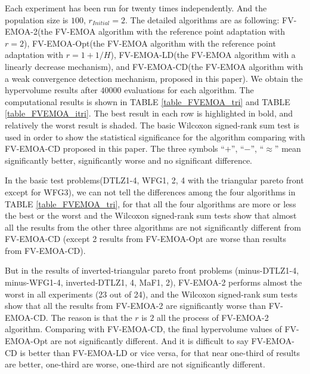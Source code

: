 \documentclass[conference]{IEEEtran}
\begin{document}
Each experiment has been run for twenty times independently. 
And the population size is $100$, $r_{Initial}=2$.
The detailed algorithms are as following: 
FV-EMOA-2(the FV-EMOA\cite{FVEMOA} algorithm with the reference point adaptation with $r=2$),
FV-EMOA-Opt(the FV-EMOA algorithm with the reference point adaptation with $r=1+1/H$),
FV-EMOA-LD(the FV-EMOA algorithm with a linearly decrease mechanism),
and FV-EMOA-CD(the FV-EMOA algorithm with a weak convergence detection mechanism, proposed in this paper).
We obtain the hypervolume results after $40000$ evaluations for each algorithm. 
The computational results is shown in TABLE \ref{table_FVEMOA_tri} and TABLE \ref{table_FVEMOA_itri}. 
The best result in each row is highlighted in bold, and relatively the worst result is shaded. 
The basic Wilcoxon signed-rank sum test is used in order to show the statistical significance for the algorithm
comparing with FV-EMOA-CD proposed in this paper. The three symbols ``$+$'', ``$-$'', ``$\approx$'' 
mean significantly better, significantly worse and no significant difference.

In the basic test problems(DTLZ1-4, WFG1, 2, 4 with the triangular pareto front except for WFG3), 
we can not tell the differences among the four algorithms in TABLE \ref{table_FVEMOA_tri},
for that all the four algorithms are more or less the best or the worst 
and the Wilcoxon signed-rank sum tests show that almost all the results from the other three algorithms are not significantly different from FV-EMOA-CD
(except 2 results from FV-EMOA-Opt are worse than results from FV-EMOA-CD). 

But in the results of inverted-triangular pareto front problems (minus-DTLZ1-4, minus-WFG1-4, inverted-DTLZ1, 4, MaF1, 2), 
FV-EMOA-2 performs almost the worst in all experiments (23 out of 24), 
and the Wilcoxon signed-rank sum tests show that all the results from FV-EMOA-2 are significantly worse than FV-EMOA-CD. 
The reason is that the $r$ is $2$ all the process of FV-EMOA-2 algorithm. 
Comparing with FV-EMOA-CD, the final hypervolume values of FV-EMOA-Opt are not significantly different. 
And it is difficult to say FV-EMOA-CD is better than FV-EMOA-LD or vice versa,
for that near one-third of results are better, one-third are worse, one-third are not significantly different. 

% 
\end{document}
